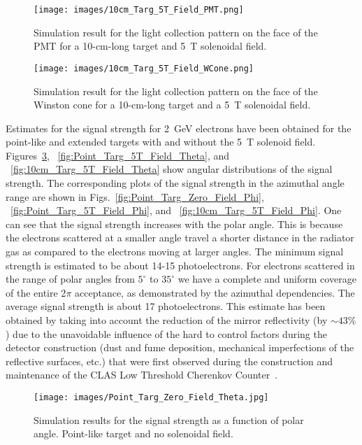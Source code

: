 \begin{figure}[!ht]
    \centering
    \texttt{[image: images/10cm\_Targ\_5T\_Field\_PMT.png]}
    \caption{Simulation result for the light collection pattern on the face of the PMT for a 10-cm-long target and 5~T
      solenoidal field.}
    \label{fig:10cm_Targ_5T_Field_PMT}
\end{figure}

\begin{figure}[!ht]
    \centering
    \texttt{[image: images/10cm\_Targ\_5T\_Field\_WCone.png]}
    \caption{Simulation result for the light collection pattern on the face of the Winston cone for a 10-cm-long target
      and a 5~T solenoidal field.}
    \label{fig:10cm_Targ_5T_Field_WCone}
\end{figure}

Estimates for the signal strength for 2~GeV electrons have been obtained for the point-like and extended targets
with and without the 5~T solenoid field. Figures~\ref{fig:Point_Targ_Zero_Field_Theta}, 
~\ref{fig:Point_Targ_5T_Field_Theta}, and ~\ref{fig:10cm_Targ_5T_Field_Theta} show angular distributions of
the signal strength. The corresponding plots of the signal strength in the azimuthal angle range are shown in
Figs.~\ref{fig:Point_Targ_Zero_Field_Phi}, ~\ref{fig:Point_Targ_5T_Field_Phi}, and 
~\ref{fig:10cm_Targ_5T_Field_Phi}. One can see that the signal strength increases with the polar angle. This
is because the electrons scattered at a smaller angle travel a shorter distance in the radiator gas as compared to
the electrons moving at larger angles. The minimum signal strength is estimated to be about 14-15 photoelectrons.
For electrons scattered in the range of polar angles from $5^\circ$ to $35^\circ$ we have a complete and uniform
coverage of the entire 2$\pi$ acceptance, as demonstrated by the azimuthal dependencies. The average signal
strength is about 17 photoelectrons. This estimate has been obtained by taking into account the reduction of
the mirror reflectivity (by $\sim43\%$) due to the unavoidable influence of the hard to control factors during the detector construction
(dust and fume deposition, mechanical imperfections of the reflective surfaces, etc.) that were first observed during
the construction and maintenance of the CLAS Low Threshold Cherenkov Counter~\cite{Adams:2001kk}.

\begin{figure}[!ht]
    \centering
    \texttt{[image: images/Point\_Targ\_Zero\_Field\_Theta.jpg]}
    \caption{Simulation results for the signal strength as a function of polar angle. Point-like target and no solenoidal
      field.}
    \label{fig:Point_Targ_Zero_Field_Theta}
\end{figure}

